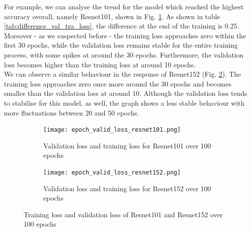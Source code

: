 For example, we can analyse the trend for the model which reached the highest accuracy overall, namely Resnet101, shown in Fig. \ref{fig:epoch_valid_loss_resnet101}. As shown in table \ref{tab:difference_val_tra_loss}, the difference at the end of the training is 0.25. Moreover - as we suspected before - the training loss approaches zero within the first 30 epochs, while the validation loss remains stable for the entire training process, with some spikes at around the 30 epochs. Furthermore, the validation loss becomes higher than the training loss at around 10 epochs.\\
We can observe a similar behaviour in the response of Resnet152 (Fig. \ref{fig:epoch_valid_loss_resnet152}). The training loss approaches zero once more around the 30 epochs and becomes smaller than the validation loss at around 10. Although the validation loss tends to stabilise for this model, as well, the graph shows a less stable behaviour with more fluctuations between 20 and 50 epochs. \\
\begin{figure}[h]
\begin{subfigure}{0.5\textwidth}
     \centering
	    \texttt{[image: epoch\_valid\_loss\_resnet101.png]}
\caption{Validation loss and training loss for Resnet101 over 100 epochs}\label{fig:epoch_valid_loss_resnet101}
     \end{subfigure}
\begin{subfigure}{0.5\textwidth}
     \centering
	    \texttt{[image: epoch\_valid\_loss\_resnet152.png]}
\caption{Validation loss and training loss for Resnet152 over 100 epochs}\label{fig:epoch_valid_loss_resnet152}
     \end{subfigure}  
     \caption{Training loss and validation loss of Resnet101 and Resnet152 over 100 epochs}
        \label{fig:tran_valid_loss_seeds_res_100}
\end{figure}

